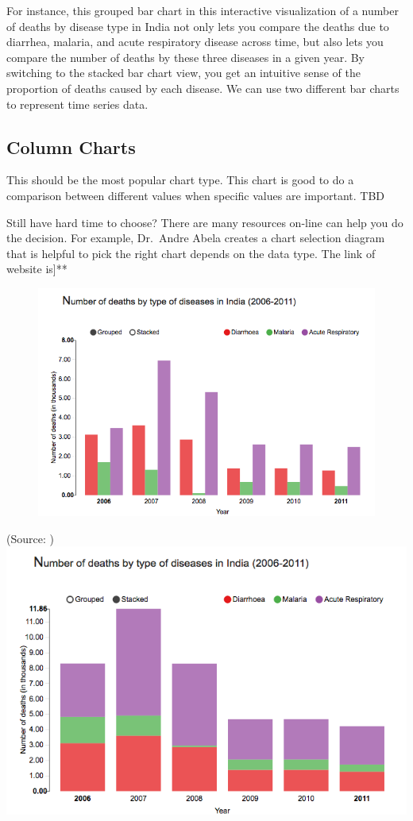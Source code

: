 \documentclass[]{book}
\theoremstyle{definition}
\theoremstyle{definition}
\theoremstyle{definition}
\theoremstyle{remark}
\begin{document}
For instance, this grouped bar chart in this interactive visualization
of a number of deaths by disease type in India not only lets you compare
the deaths due to diarrhea, malaria, and acute respiratory disease
across time, but also lets you compare the number of deaths by these
three diseases in a given year. By switching to the stacked bar chart
view, you get an intuitive sense of the proportion of deaths caused by
each disease. We can use two different bar charts to represent time
series data.

\subsection{Column Charts}\label{column-charts}

This should be the most popular chart type. This chart is good to do a
comparison between different values when specific values are important.
TBD

Still have hard time to choose? There are many resources on-line can
help you do the decision. For example, Dr.~Andre Abela creates a chart
selection diagram that is helpful to pick the right chart depends on the
data type. The link of website is{]}**

\begin{figure}
\centering
\includegraphics{images/aya-bar1.png}
\caption{}
\end{figure}

(Source: \citep{aya-time-series}) \includegraphics{images/aya-bar2.png}
\end{document}
